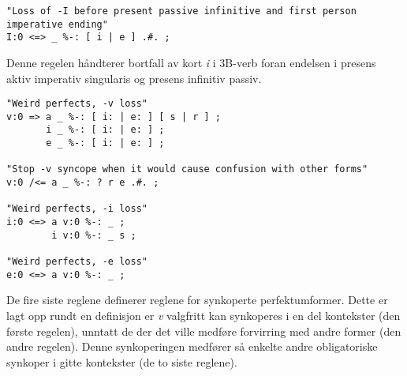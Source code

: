 \documentclass{article}
\let\w\emph
\begin{document}
\begin{lstlisting}[name=verbs-twolc.txt]
"Loss of -I before present passive infinitive and first person imperative ending"
I:0 <=> _ %-: [ i | e ] .#. ;
\end{lstlisting}

Denne regelen h\aa{}ndterer bortfall av kort \w{i} i 3B-verb foran endelsen i
presens aktiv imperativ singularis og presens infinitiv passiv.

\begin{lstlisting}[name=verbs-twolc.txt]
"Weird perfects, -v loss"
v:0 => a _ %-: [ i: | e: ] [ s | r ] ;
       i _ %-: [ i: | e: ] ;
       e _ %-: [ i: | e: ] ;

"Stop -v syncope when it would cause confusion with other forms"
v:0 /<= a _ %-: ? r e .#. ;

"Weird perfects, -i loss"
i:0 <=> a v:0 %-: _ ;
        i v:0 %-: _ s ;

"Weird perfects, -e loss"
e:0 <=> a v:0 %-: _ ;
\end{lstlisting}

De fire siste reglene definerer reglene for synkoperte perfektumformer. Dette
er lagt opp rundt en definisjon er \w{v} valgfritt kan synkoperes i en del
kontekster (den f\o{}rste regelen), unntatt de der det ville medf\o{}re
forvirring med andre former (den andre regelen). Denne synkoperingen
medf\o{}rer s\aa{} enkelte andre obligatoriske synkoper i gitte kontekster (de
to siste reglene).

\clearpage

{}

\tableofcontents
\listoftables
\end{document}
